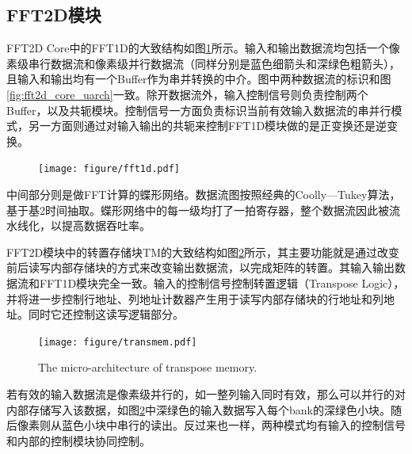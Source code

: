 \documentclass[master]{shtthesis}             %
\begin{document}
\subsection{FFT2D模块}
FFT2D Core中的FFT1D的大致结构如图\ref{fig:fft_arch}所示。输入和输出数据流均包括一个像素级串行数据流和像素级并行数据流（同样分别是蓝色细箭头和深绿色粗箭头），且输入和输出均有一个Buffer作为串并转换的中介。图中两种数据流的标识和图\ref{fig:fft2d_core_uarch}一致。除开数据流外，输入控制信号则负责控制两个Buffer，以及共轭模块。控制信号一方面负责标识当前有效输入数据流的串并行模式，另一方面则通过对输入输出的共轭来控制FFT1D模块做的是正变换还是逆变换。
\begin{figure}[!tb]
    \centering
    \texttt{[image: figure/fft1d.pdf]}
    \label{fig:fft_arch}
\end{figure}
中间部分则是做FFT计算的蝶形网络。数据流图按照经典的Coolly—Tukey算法，基于基2时间抽取。蝶形网络中的每一级均打了一拍寄存器，整个数据流因此被流水线化，以提高数据吞吐率。

FFT2D模块中的转置存储块TM的大致结构如图\ref{fig:transmem}所示，其主要功能就是通过改变前后读写内部存储块的方式来改变输出数据流，以完成矩阵的转置。其输入输出数据流和FFT1D模块完全一致。输入的控制信号控制转置逻辑（Transpose Logic），并将进一步控制行地址、列地址计数器产生用于读写内部存储块的行地址和列地址。同时它还控制这读写逻辑部分。
\begin{figure}[!tb]
  \centering
  \texttt{[image: figure/transmem.pdf]}
  \caption{}{The micro-architecture of transpose memory.}
  \label{fig:transmem}
\end{figure}
若有效的输入数据流是像素级并行的，如一整列输入同时有效，那么可以并行的对内部存储写入该数据，如图\ref{fig:transmem}中深绿色的输入数据写入每个bank的深绿色小块。随后像素则从蓝色小块中串行的读出。反过来也一样，两种模式均有输入的控制信号和内部的控制模块协同控制。
\end{document}
